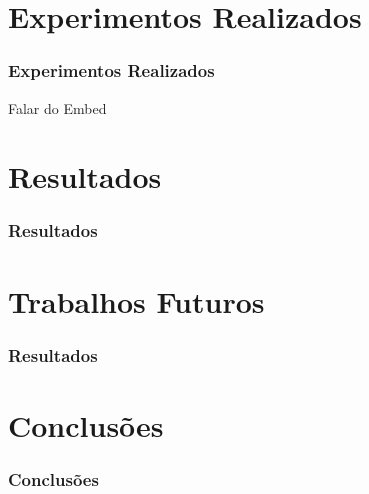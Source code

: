 \section{Experimentos Realizados}
\begin{frame}
	\frametitle{Experimentos Realizados}
	
	Falar do Embed
	
	
	
\end{frame}
\section{Resultados}
\begin{frame}
	\frametitle{Resultados}
	
	
	
	
\end{frame}
\section{Trabalhos Futuros}
\begin{frame}
	\frametitle{Resultados}
	
	
	
	
\end{frame}
\section{Conclusões}
\begin{frame}
	\frametitle{Conclusões}
	
	
	
	
\end{frame}




















